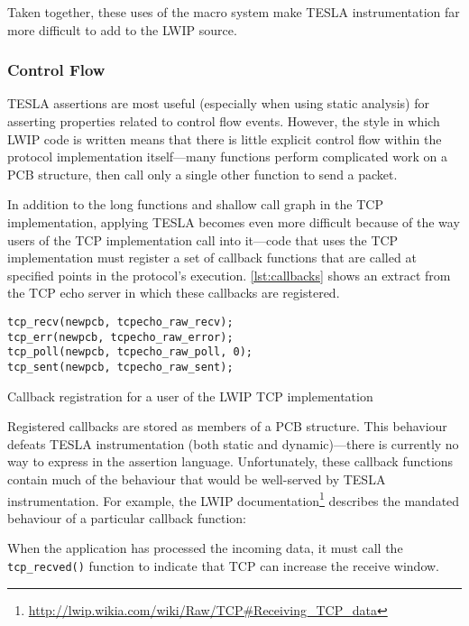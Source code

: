 Taken together, these uses of the macro system make TESLA
instrumentation far more difficult to add to the LWIP source.

\subsubsection{Control Flow}

TESLA assertions are most useful (especially when using static analysis)
for asserting properties related to control flow events. However, the
style in which LWIP code is written means that there is little explicit
control flow within the protocol implementation itself---many functions
perform complicated work on a PCB structure, then call only a single
other function to send a packet.

In addition to the long functions and shallow call graph in the TCP
implementation, applying TESLA becomes even more difficult because of
the way users of the TCP implementation call into it---code that uses
the TCP implementation must register a set of callback functions that
are called at specified points in the protocol's execution.
\autoref{lst:callbacks} shows an extract from the TCP echo server in
which these callbacks are registered.

\begin{listing}
  \begin{verbatim}
tcp_recv(newpcb, tcpecho_raw_recv);
tcp_err(newpcb, tcpecho_raw_error);
tcp_poll(newpcb, tcpecho_raw_poll, 0);
tcp_sent(newpcb, tcpecho_raw_sent);
  \end{verbatim}
  \caption{Callback registration for a user of the LWIP TCP implementation}
  \label{lst:callbacks}
\end{listing}

Registered callbacks are stored as members of a PCB structure. This
behaviour defeats TESLA instrumentation (both static and
dynamic)---there is currently no way to express  in the assertion language.
Unfortunately, these callback functions contain much of the behaviour
that would be well-served by TESLA instrumentation. For example, the
LWIP
documentation\footnote{\url{http://lwip.wikia.com/wiki/Raw/TCP\#Receiving_TCP_data}}
describes the mandated behaviour of a particular callback function:

\begin{displayquote}
When the application has processed the incoming data, it must call the
\texttt{tcp_recved()} function to indicate that TCP can increase
the receive window.
\end{displayquote}


